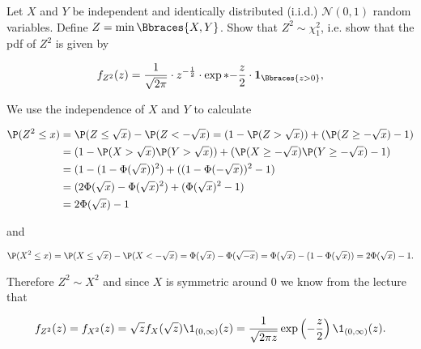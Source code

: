 
\begin{exercise}

Let $X$ and $Y$ be independent and identically distributed (i.i.d.) $\mathcal N(0, 1)$ random variables.
Define $Z = \min \Bbraces{X, Y}$.
Show that $Z^2 \sim \chi_1^2$, i.e. show that the pdf of $Z^2$ is given by

\begin{align*}
    f_{Z^2}(z)
    =
    \frac{1}{\sqrt{2 \pi}} \cdot z^{-\frac{1}{2}} \cdot \exp*{-\frac{z}{2}} \cdot \mathbf 1_\Bbraces{z > 0},
\end{align*}

\end{exercise}


\begin{solution}

We use the independence of $X$ and $Y$ to calculate

\begin{align*}
  \P(Z^2 \leq x) &= \P(Z \leq \sqrt{x}) - \P(Z < -\sqrt{x})
  = (1 - \P(Z > \sqrt{x})) + (\P(Z \geq -\sqrt{x}) - 1) \\
  &= (1 - \P(X > \sqrt{x})\P(Y > \sqrt{x})) + (\P(X \geq - \sqrt{x})\P(Y \geq - \sqrt{x}) - 1) \\
  &= (1 - (1 - \Phi(\sqrt{x}))^2) + ((1 - \Phi(-\sqrt{x}))^2-1) \\
  &=  (2\Phi(\sqrt{x}) - \Phi(\sqrt{x})^2 ) + (\Phi(\sqrt{x})^2-1) \\
  &= 2\Phi(\sqrt{x}) - 1
\end{align*}

and

\begin{align*}
  \P(X^2 \leq x) = \P(X \leq \sqrt{x}) - \P(X < -\sqrt{x}) = \Phi(\sqrt{x}) - \Phi(\sqrt{-x})
  = \Phi(\sqrt{x}) - (1 - \Phi(\sqrt{x})) = 2\Phi(\sqrt{x}) - 1.
\end{align*}

Therefore $Z^2 \sim X^2$ and since $X$ is symmetric around 0 we know from the lecture that

\begin{align*}
  f_{Z^2}(z) = f_{X^2}(z) = \sqrt{z}f_X(\sqrt{z})\1_{(0,\infty)}(z) = \frac{1}{\sqrt{2\pi z}}\exp\left(-\frac{z}{2}\right)\1_{(0,\infty)}(z).
\end{align*}

\end{solution}


